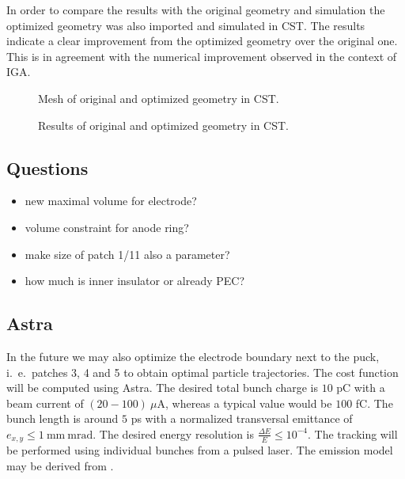 In order to compare the results with the original geometry and simulation the optimized geometry was also imported and simulated in CST. The results indicate a clear improvement from the optimized geometry over the original one. This is in agreement with the numerical improvement observed in the context of IGA.

\begin{center}
\begin{figure}[H]
   \begin{subfigure}{0.45\textwidth}
   \end{subfigure}
   \begin{subfigure}{0.45\textwidth}
   \end{subfigure}
   \caption{Mesh of original and optimized geometry in CST.}
\end{figure}
\end{center}

\begin{center}
\begin{figure}[H]
   \begin{subfigure}{0.45\textwidth}
   \end{subfigure}
   \begin{subfigure}{0.45\textwidth}
   \end{subfigure}
   \caption{Results of original and optimized geometry in CST.}
\end{figure}
\end{center}

\subsection{Questions}
\begin{itemize}
   \item new maximal volume for electrode?
   \item volume constraint for anode ring?
   \item make size of patch 1/11 also a parameter?
   \item how much is inner insulator or already PEC?
\end{itemize}

\subsection{Astra}
In the future we may also optimize the electrode boundary next to the puck, i.~e.~patches 3, 4 and 5 to obtain optimal particle trajectories. The cost function will be computed using Astra.
The desired total bunch charge is $10$ pC with a beam current of $(20-100)\ \mu\mathrm{A}$, whereas a typical value would be $100$ fC. The bunch length is around $5$ ps with a normalized transversal emittance of $e_{x,y} \leq 1\ \mathrm{mm\: mrad}$. The desired energy resolution is $\frac{\Delta E}{E} \leq 10^{-4}$.
The tracking will be performed using individual bunches from a pulsed laser. The emission model may be derived from \cite{wagner}.
